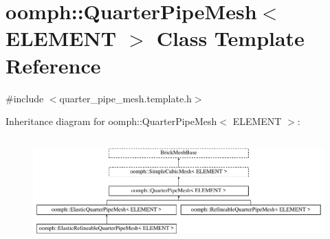 \hypertarget{classoomph_1_1QuarterPipeMesh}{}\section{oomph\+:\+:Quarter\+Pipe\+Mesh$<$ E\+L\+E\+M\+E\+NT $>$ Class Template Reference}
\label{classoomph_1_1QuarterPipeMesh}


{\ttfamily \#include $<$quarter\+\_\+pipe\+\_\+mesh.\+template.\+h$>$}

Inheritance diagram for oomph\+:\+:Quarter\+Pipe\+Mesh$<$ E\+L\+E\+M\+E\+NT $>$\+:\begin{figure}[H]
\begin{center}
\leavevmode
\includegraphics[height=4.093567cm]{classoomph_1_1QuarterPipeMesh}
\end{center}
\end{figure}
